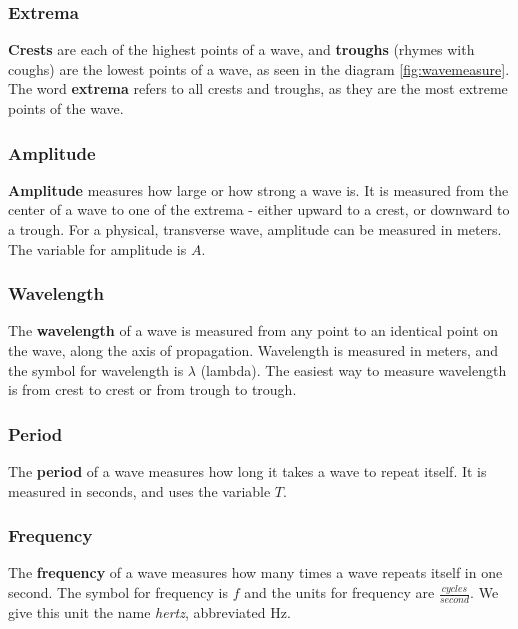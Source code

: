 	\subsubsection{Extrema}     
	
	\textbf{Crests} are each of the highest points of a wave, and \textbf{troughs} (rhymes with coughs) are the lowest points of a wave, as seen in the diagram \ref{fig:wavemeasure}.  The word \textbf{extrema} refers to all crests and troughs, as they are the most extreme points of the wave. 
	
	\subsubsection{Amplitude}   \textbf{Amplitude} measures how large or how strong a wave is.  It is measured from the center of a wave to one of the extrema - either upward to a crest, or downward to a trough.  For a physical, transverse wave, amplitude can be measured in meters.  The variable for amplitude is $A$.  
	
	\subsubsection{Wavelength} 
	The \textbf{wavelength} of a wave is measured from any point to an identical point on the wave, along the axis of propagation.  Wavelength is measured in meters, and the symbol for wavelength is $\lambda$ (lambda).  The easiest way to measure wavelength is from crest to crest or from trough to trough. 
	
	\subsubsection{Period} 
	The \textbf{period} of a wave measures how long it takes a wave to repeat itself.  It is measured in seconds, and uses the variable $T$.  
	
	\subsubsection{Frequency}  
	The \textbf{frequency} of a wave measures how many times a wave repeats itself in one second.  The symbol for frequency is $f$ and the units for frequency are $\frac{cycles}{second} $.  We give this unit the name \textit{hertz}, abbreviated Hz. 
	
